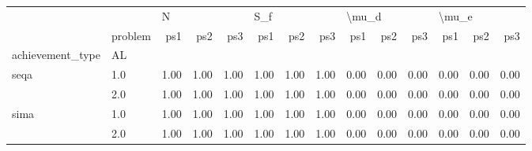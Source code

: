 \begin{tabular}{llrrrrrrrrrrrr}
\toprule
     & {} & \multicolumn{3}{l}{N} & \multicolumn{3}{l}{S\_f} & \multicolumn{3}{l}{\textbackslash mu\_d} & \multicolumn{3}{l}{\textbackslash mu\_e} \\
     & problem &  ps1 &  ps2 &  ps3 &  ps1 &  ps2 &  ps3 &   ps1 &  ps2 &  ps3 &   ps1 &  ps2 &  ps3 \\
achievement\_type & AL &      &      &      &      &      &      &       &      &      &       &      &      \\
\midrule
seqa & 1.0 & 1.00 & 1.00 & 1.00 & 1.00 & 1.00 & 1.00 &  0.00 & 0.00 & 0.00 &  0.00 & 0.00 & 0.00 \\
     & 2.0 & 1.00 & 1.00 & 1.00 & 1.00 & 1.00 & 1.00 &  0.00 & 0.00 & 0.00 &  0.00 & 0.00 & 0.00 \\
sima & 1.0 & 1.00 & 1.00 & 1.00 & 1.00 & 1.00 & 1.00 &  0.00 & 0.00 & 0.00 &  0.00 & 0.00 & 0.00 \\
     & 2.0 & 1.00 & 1.00 & 1.00 & 1.00 & 1.00 & 1.00 &  0.00 & 0.00 & 0.00 &  0.00 & 0.00 & 0.00 \\
\bottomrule
\end{tabular}
